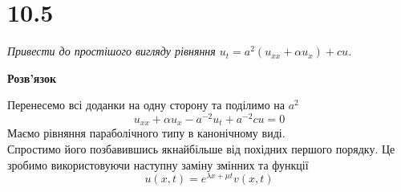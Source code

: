 %
%
%
%
%

\section[Задача №10.5]{10.5}

\textit{Привести до простішого вигляду рівняння $u_t = a^2(u_{xx} + \alpha u_x) + cu$.}

\begin{center}
    \large{\textbf{Розв'язок}}
\end{center}

Перенесемо всі доданки на одну сторону та поділимо на $a^2$
\begin{equation} \label{eq10,5}
    u_{xx} + \alpha u_x - a^{-2}u_t + a^{-2}cu = 0
\end{equation}
Маємо рівняння параболічного типу в канонічному виді.\\
Спростимо його позбавившись якнайбільше від похідних першого порядку. Це зробимо використовуючи наступну заміну змінних та функції
\begin{equation}
    u(x,t) =  e^{\lambda x + \mu t} v(x,t)
\end{equation}


